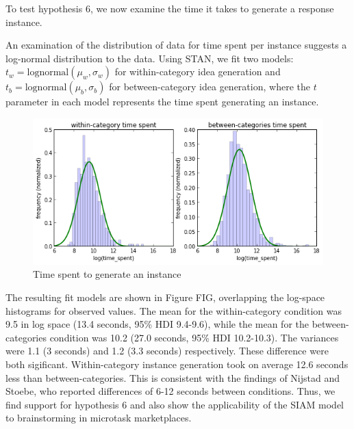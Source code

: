 To test hypothesis 6, we now examine the time it takes to generate a response instance.

An examination of the distribution of data for time spent per instance suggests a log-normal distribution to the data. Using STAN, we fit two models: $t_w = \text{lognormal}(\mu_w, \sigma_w)$ for within-category idea generation and $t_b = \text{lognormal}(\mu_b, \sigma_b)$ for between-category idea generation, where the $t$ parameter in each model represents the time spent generating an instance.

\begin{figure}[h]
    \centering
    \includegraphics[width=0.9\columnwidth]{hyp5_comparison}
    \caption{Time spent to generate an instance}
\end{figure}

The resulting fit models are shown in Figure FIG, overlapping the log-space histograms for observed values. The mean for the within-category condition was 9.5 in log space (13.4 seconds, 95\% HDI 9.4-9.6), while the mean for the between-categories condition was 10.2 (27.0 seconds, 95\% HDI 10.2-10.3). The variances were 1.1 (3 seconds) and 1.2 (3.3 seconds) respectively. These difference were both sigificant. Within-category instance generation took on average 12.6 seconds less than between-categories. This is consistent with the findings of Nijstad and Stoebe, who reported differences of 6-12 seconds between conditions. Thus, we find support for hypothesis 6 and also show the applicability of the SIAM model to brainstorming in microtask marketplaces.


